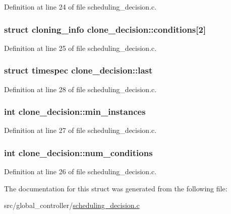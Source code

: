 Definition at line 24 of file scheduling\-\_\-decision.\-c.

\hypertarget{structclone__decision_ae84268034a0e7757434e248585ab3dbe}{
\subsubsection[{conditions}]{\setlength{\rightskip}{0pt plus 5cm}struct {\bf cloning\-\_\-info} clone\-\_\-decision\-::conditions\mbox{[}2\mbox{]}}}\label{structclone__decision_ae84268034a0e7757434e248585ab3dbe}


Definition at line 25 of file scheduling\-\_\-decision.\-c.

\hypertarget{structclone__decision_a05c1d1a8a5d670647dfde1e854ffb82b}{
\subsubsection[{last}]{\setlength{\rightskip}{0pt plus 5cm}struct timespec clone\-\_\-decision\-::last}}\label{structclone__decision_a05c1d1a8a5d670647dfde1e854ffb82b}


Definition at line 28 of file scheduling\-\_\-decision.\-c.

\hypertarget{structclone__decision_ad16c65d3fc8367b519b479127b47d281}{
\subsubsection[{min\-\_\-instances}]{\setlength{\rightskip}{0pt plus 5cm}int clone\-\_\-decision\-::min\-\_\-instances}}\label{structclone__decision_ad16c65d3fc8367b519b479127b47d281}


Definition at line 27 of file scheduling\-\_\-decision.\-c.

\hypertarget{structclone__decision_acff7bab31412f4ef8029ab063cc4a72b}{
\subsubsection[{num\-\_\-conditions}]{\setlength{\rightskip}{0pt plus 5cm}int clone\-\_\-decision\-::num\-\_\-conditions}}\label{structclone__decision_acff7bab31412f4ef8029ab063cc4a72b}


Definition at line 26 of file scheduling\-\_\-decision.\-c.



The documentation for this struct was generated from the following file\-:\begin{DoxyCompactItemize}
\item 
src/global\-\_\-controller/\hyperlink{scheduling__decision_8c}{scheduling\-\_\-decision.\-c}\end{DoxyCompactItemize}
